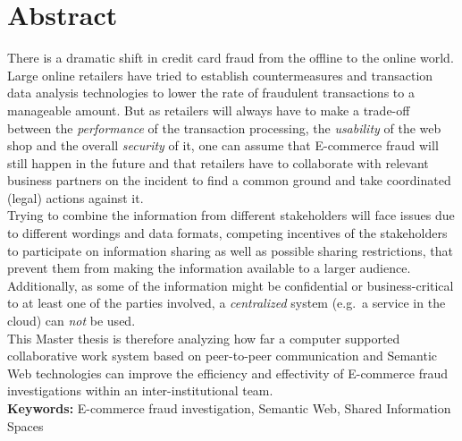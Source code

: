 
\chapter*{Abstract}

There is a dramatic shift in credit card fraud from the offline to the online world. Large online retailers have tried to establish countermeasures and transaction data analysis technologies to lower the rate of fraudulent transactions to a manageable amount. But as retailers will always have to make a trade-off between the \emph{performance} of the transaction processing, the \emph{usability} of the web shop and the overall \emph{security} of it, one can assume that \gls{E-commerce} fraud will still happen in the future and that retailers have to collaborate with relevant business partners on the incident to find a common ground and take coordinated (legal) actions against it. \\

Trying to combine the information from different stakeholders will face issues due to different wordings and data formats, competing incentives of the stakeholders to participate on information sharing as well as possible sharing restrictions, that prevent them from making the information available to a larger audience. Additionally, as some of the information might be confidential or business-critical to at least one of the parties involved, a \emph{centralized} system (e.g.\ a service in the cloud) can \emph{not} be used. \\

This Master thesis is therefore analyzing how far a computer supported collaborative work system based on peer-to-peer communication and Semantic Web technologies can improve the efficiency and effectivity of \gls{E-commerce} fraud investigations within an inter-institutional team. \\[2em]

\textbf{Keywords:} \gls{E-commerce} fraud investigation, Semantic Web, Shared Information Spaces

